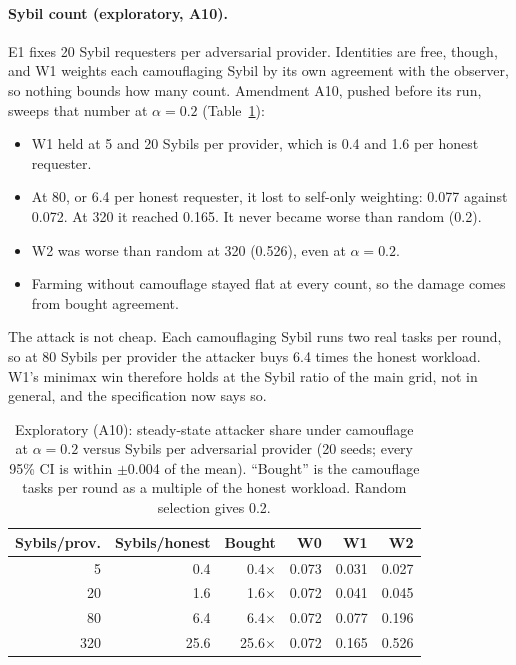 \paragraph{Sybil count (exploratory, A10).}
E1 fixes 20 Sybil requesters per adversarial provider. Identities are
free, though, and W1 weights each camouflaging Sybil by its own agreement
with the observer, so nothing bounds how many count. Amendment A10,
pushed before its run, sweeps that number at $\alpha{=}0.2$
(Table~\ref{tab:sybils}):
\begin{itemize}
\item W1 held at 5 and 20 Sybils per provider, which is 0.4 and 1.6 per
  honest requester.
\item At 80, or 6.4 per honest requester, it lost to self-only weighting:
  0.077 against 0.072. At 320 it reached 0.165. It never became worse
  than random (0.2).
\item W2 was worse than random at 320 (0.526), even at $\alpha{=}0.2$.
\item Farming without camouflage stayed flat at every count, so the
  damage comes from bought agreement.
\end{itemize}
The attack is not cheap. Each camouflaging Sybil runs two real tasks per
round, so at 80 Sybils per provider the attacker buys 6.4 times the
honest workload. W1's minimax win therefore holds at the Sybil ratio of
the main grid, not in general, and the specification now says so.

\begin{table}[t]
\caption{Exploratory (A10): steady-state attacker share under camouflage
at $\alpha{=}0.2$ versus Sybils per adversarial provider (20 seeds; every
95\% CI is within $\pm$0.004 of the mean). ``Bought'' is the camouflage
tasks per round as a multiple of the honest workload. Random selection
gives 0.2.}
\label{tab:sybils}
\small
\begin{tabular}{@{}rrrrrr@{}}
\toprule
Sybils/prov. & Sybils/honest & Bought & W0 & W1 & W2 \\
\midrule
5 & 0.4 & 0.4$\times$ & 0.073 & 0.031 & 0.027 \\
20 & 1.6 & 1.6$\times$ & 0.072 & 0.041 & 0.045 \\
80 & 6.4 & 6.4$\times$ & 0.072 & 0.077 & 0.196 \\
320 & 25.6 & 25.6$\times$ & 0.072 & 0.165 & 0.526 \\
\bottomrule
\end{tabular}
\end{table}

